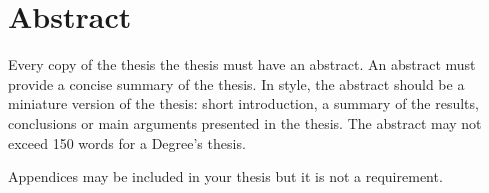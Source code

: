 \documentclass[a4paper,12pt]{article}
\begin{document}


\newpage
\tableofcontents

\newpage
\listoffigures
\lstlistoflistings
\listoftables

\newpage

\newpage
\section*{Abstract}
 {Every copy of the thesis the thesis must have an abstract. An abstract must provide a concise summary of the thesis. In style, the
  abstract should be a miniature version of the thesis: short introduction, a summary of the results, conclusions or main
  arguments presented in the thesis. The abstract may not exceed 150 words for a Degree’s thesis.}

\newpage




\newpage

\label{sec:introduction}


\label{sec:state}


\clearpage

\label{sec:methodology}

\clearpage

\label{sec:implementation}



\clearpage

\label{sec:budget}

\clearpage

\label{sec:conclusions}


\label{sec:futurework}




\newpage

\medskip




\clearpage
\newpage
\begin{appendices}

    {Appendices may be included in your thesis but it is not a requirement.}

\end{appendices}
\end{document}
